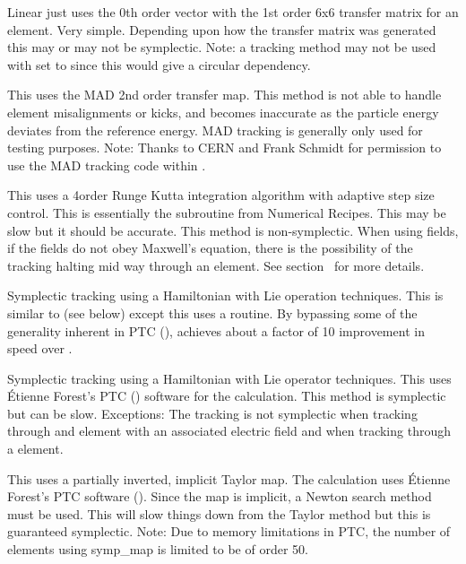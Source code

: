 \begin{description}
\item[\vn{Linear}]
Linear just uses the 0th order vector with the 1st order 6x6 transfer matrix for an element. Very
simple. Depending upon how the transfer matrix was generated this may or may not be
symplectic. Note: a  tracking method may not be used with  set to
 since this would give a circular dependency.

\item[\vn{MAD}]
This uses the MAD 2nd order transfer map. This method is not able to
handle element misalignments or kicks, and becomes inaccurate as the
particle energy deviates from the reference energy. MAD tracking is
generally only used for testing purposes. Note: Thanks to CERN and
Frank Schmidt for permission to use the MAD tracking code within
\bmad.

\item[\vn{runge_kutta}]
This uses a 4\Th order Runge Kutta integration algorithm with adaptive
step size control.  This is essentially the  subroutine
from Numerical Recipes\cite{b:nr}. This may be slow but it should be
accurate. This method is non-symplectic.  When using
 fields, if the fields do not obey Maxwell's equation,
there is the possibility of the  tracking halting mid
way through an element. See section~ for more details.

\item[\vn{Symp_Lie_Bmad}]
Symplectic tracking using a Hamiltonian with Lie operation techniques.
This is similar to  (see below) except this uses a
\bmad routine. By bypassing some of the generality inherent in PTC
(),  achieves about a factor of 10
improvement in speed over .

\item[\vn{Symp_Lie_PTC}]
Symplectic tracking using a Hamiltonian with Lie operator techniques.
This uses \'Etienne Forest's PTC () software for the
calculation. This method is symplectic but can be slow. Exceptions: The tracking is
not symplectic when tracking through and element with an associated electric field
and when tracking through a  element. 

\item[\vn{Symp_Map}]
This uses a partially inverted, implicit Taylor map. The calculation
uses \'Etienne Forest's PTC software ().  Since the
map is implicit, a Newton search method must be used. This will slow
things down from the Taylor method but this is guaranteed
symplectic. Note: Due to memory limitations in PTC, the number of
elements using symp_map is limited to be of order 50.


\end{description}
